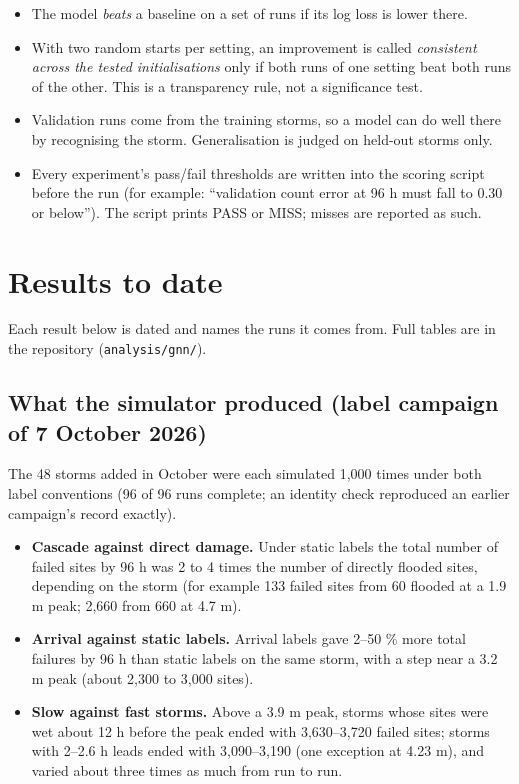 \documentclass[11pt]{article}
\begin{document}
\begin{itemize}
\item The model \emph{beats} a baseline on a set of runs if its log loss is lower there.
\item With two random starts per setting, an improvement is called \emph{consistent across the tested initialisations} only if both runs of one setting beat both runs of the other. This is a transparency rule, not a significance test.
\item Validation runs come from the training storms, so a model can do well there by recognising the storm. Generalisation is judged on held-out storms only.
\item Every experiment's pass/fail thresholds are written into the scoring script before the run (for example: ``validation count error at 96 h must fall to 0.30 or below''). The script prints PASS or MISS; misses are reported as such.
\end{itemize}

\section{Results to date}\label{sec:results}

Each result below is dated and names the runs it comes from. Full tables are in the repository (\texttt{analysis/gnn/}).

\subsection{What the simulator produced (label campaign of 7 October 2026)}

The 48 storms added in October were each simulated 1,000 times under both label conventions (96 of 96 runs complete; an identity check reproduced an earlier campaign's record exactly).
\begin{itemize}
\item \textbf{Cascade against direct damage.} Under static labels the total number of failed sites by 96 h was 2 to 4 times the number of directly flooded sites, depending on the storm (for example 133 failed sites from 60 flooded at a 1.9 m peak; 2,660 from 660 at 4.7 m).
\item \textbf{Arrival against static labels.} Arrival labels gave 2--50 \% more total failures by 96 h than static labels on the same storm, with a step near a 3.2 m peak (about 2,300 to 3,000 sites).
\item \textbf{Slow against fast storms.} Above a 3.9 m peak, storms whose sites were wet about 12 h before the peak ended with 3,630--3,720 failed sites; storms with 2--2.6 h leads ended with 3,090--3,190 (one exception at 4.23 m), and varied about three times as much from run to run.
\end{itemize}
\end{document}
